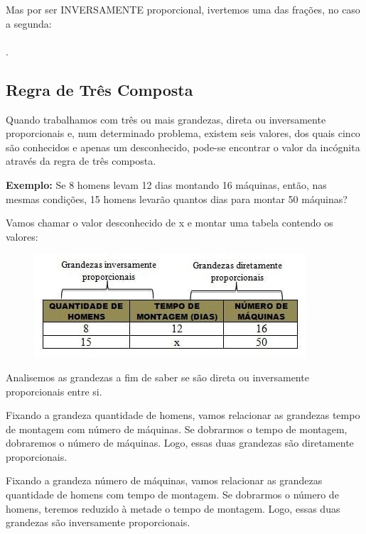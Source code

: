 \begin{multicols*}{2}
	Mas por ser INVERSAMENTE proporcional, ivertemos uma das frações, no caso a segunda:\\

	\\

	.

	\subsection{Regra de Três Composta}

	Quando trabalhamos com três ou mais grandezas, direta ou inversamente proporcionais e, num determinado problema, existem seis valores, dos quais cinco são conhecidos e apenas um desconhecido, pode-se encontrar o valor da incógnita através da regra de três composta.

	\textbf{Exemplo:} Se 8 homens levam 12 dias montando 16 máquinas, então, nas mesmas condições, 15 homens levarão quantos dias para montar 50 máquinas?

	Vamos chamar o valor desconhecido de x e montar uma tabela contendo os valores:

	\begin{figure}[H]
		\centering
		\includegraphics[width=\columnwidth]{assets/R3composta.jpg}
	\end{figure}

	Analisemos as grandezas a fim de saber se são direta ou inversamente proporcionais entre si.

	Fixando a grandeza quantidade de homens, vamos relacionar as grandezas tempo de montagem com número de máquinas. Se dobrarmos o tempo de montagem, dobraremos o número de máquinas. Logo, essas duas grandezas são diretamente proporcionais.

	Fixando a grandeza número de máquinas, vamos relacionar as grandezas quantidade de homens com tempo de montagem. Se dobrarmos o número de homens, teremos reduzido à metade o tempo de montagem. Logo, essas duas grandezas são inversamente proporcionais.


\end{multicols*}
